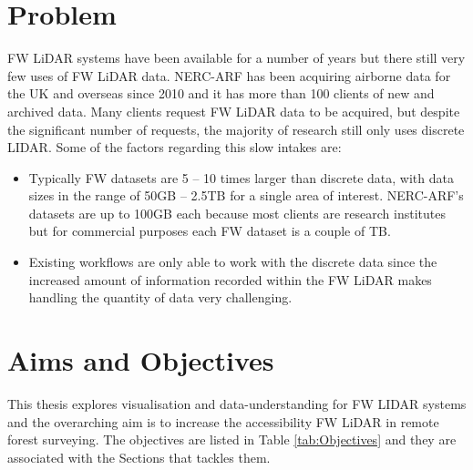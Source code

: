 \documentclass{subfiles}
\begin{document}
\section{Problem}\label{sec:Problem}
\par FW LiDAR systems have been available for a number of years but there still very few uses of FW LiDAR data. NERC-ARF has been acquiring airborne data for the UK and overseas since 2010 and it has more than 100 clients of new and archived data. Many clients request FW LiDAR data to be acquired, but despite the significant number of requests, the majority of research still only uses discrete LIDAR. Some of the factors regarding this slow intakes are:
\begin{itemize}
	\item Typically FW datasets are 5 – 10 times larger than discrete data, with data sizes in the range of 50GB – 2.5TB for a single area of interest. NERC-ARF's datasets are up to 100GB each because most clients are research institutes but for commercial purposes each FW dataset is a couple of TB.
	\item Existing workflows are only able to work with the discrete data since the increased amount of information recorded within the FW LiDAR makes handling the quantity of data very challenging.
\end{itemize}

\newpage

\section {Aims and Objectives}\label{sec:AimsObjectives}

\par This thesis explores visualisation and data-understanding for FW LIDAR systems and the overarching aim is to increase the accessibility FW LiDAR in remote forest surveying. {\color{blue}The objectives are listed in Table \ref{tab:Objectives} and they are associated with the Sections that tackles them.}
\end{document}
